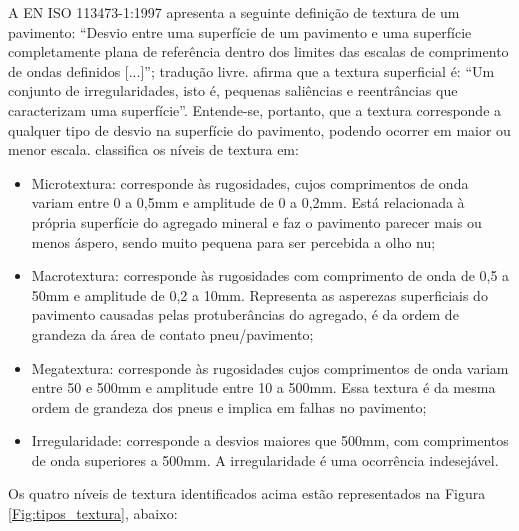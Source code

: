 A EN ISO 113473-1:1997 \nocite{iso113473} apresenta a seguinte definição de textura de um pavimento:  “Desvio entre uma superfície de um pavimento e uma superfície completamente plana de referência dentro dos limites das escalas de comprimento de ondas definidos [...]”; tradução livre. 
afirma que a textura superficial é: “Um conjunto de irregularidades, isto é, pequenas saliências e reentrâncias que caracterizam uma superfície”.
Entende-se, portanto, que a textura corresponde a qualquer tipo de desvio na superfície do pavimento, podendo ocorrer em maior ou menor escala.  classifica os níveis de textura em:

\begin{itemize}
\item Microtextura: corresponde às rugosidades, cujos comprimentos de onda
variam entre 0 a 0,5mm e amplitude de 0 a 0,2mm. Está relacionada à própria superfície do agregado mineral e faz o pavimento parecer mais ou menos áspero, sendo muito pequena para ser percebida a olho nu;

\item Macrotextura: corresponde às rugosidades com comprimento de onda de 0,5 a 50mm e amplitude de 0,2 a 10mm. Representa as asperezas superficiais do pavimento causadas pelas protuberâncias do agregado, é da ordem de grandeza da área de contato pneu/pavimento;

\item Megatextura: corresponde às rugosidades cujos comprimentos de onda variam entre 50 e 500mm e amplitude entre 10 a 500mm. Essa textura é da mesma ordem de grandeza dos pneus e implica em falhas no pavimento;

\item Irregularidade: corresponde a desvios maiores que 500mm, com comprimentos de onda superiores a 500mm. A irregularidade é uma ocorrência indesejável.
\end{itemize}

Os quatro níveis de textura identificados acima estão representados na Figura \ref{Fig:tipos_textura}, abaixo:

